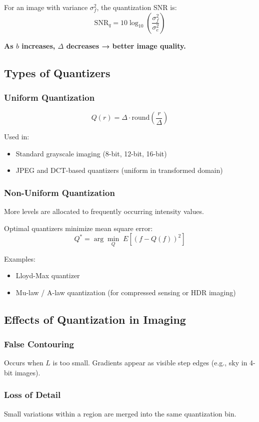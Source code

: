 \documentclass{AnantDocumentation}
\begin{document}
For an image with variance $\sigma_f^2$, the quantization SNR is:
\[
\text{SNR}_q = 10\log_{10}\left(\frac{\sigma_f^2}{\sigma_e^2}\right)
\]

\textbf{As $b$ increases, $\Delta$ decreases → better image quality.}

\subsection{Types of Quantizers}

\subsubsection{Uniform Quantization}
\[
Q(r) = \Delta \cdot \text{round}\left(\frac{r}{\Delta}\right)
\]

Used in:
\begin{itemize}
\item Standard grayscale imaging (8-bit, 12-bit, 16-bit)
\item JPEG and DCT-based quantizers (uniform in transformed domain)
\end{itemize}

\subsubsection{Non-Uniform Quantization}
More levels are allocated to frequently occurring intensity values.

Optimal quantizers minimize mean square error:
\[
Q^* = \arg\min_{Q} \; E[(f - Q(f))^2]
\]

Examples:
\begin{itemize}
\item Lloyd-Max quantizer
\item Mu-law / A-law quantization (for compressed sensing or HDR imaging)
\end{itemize}

\subsection{Effects of Quantization in Imaging}

\subsubsection{False Contouring}
Occurs when $L$ is too small.  
Gradients appear as visible step edges (e.g., sky in 4-bit images).

\subsubsection{Loss of Detail}
Small variations within a region are merged into the same quantization bin.
\end{document}
